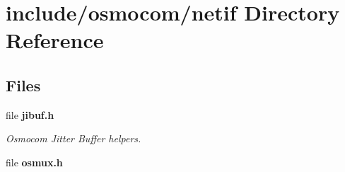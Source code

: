 \section{include/osmocom/netif Directory Reference}
\label{dir_15662fdf1b5c37dde6a3ed82e5410e57}
\subsection*{Files}
\begin{DoxyCompactItemize}
\item 
file {\bf jibuf.\+h}
\begin{DoxyCompactList}\small\item\em Osmocom Jitter Buffer helpers. \end{DoxyCompactList}\item 
file {\bf osmux.\+h}
\end{DoxyCompactItemize}
